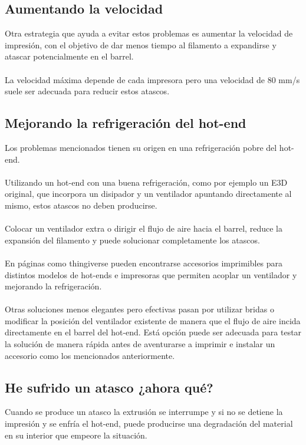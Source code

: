 \documentclass[11pt,a4paper]{article}
\begin{document}
	\subsection{Aumentando la velocidad}
Otra estrategia que ayuda a evitar estos problemas es aumentar la velocidad de impresión, con el objetivo de dar menos tiempo al filamento a expandirse y atascar potencialmente en el barrel.\\\\
La velocidad máxima depende de cada impresora pero una velocidad de 80 mm/s suele ser adecuada para reducir estos atascos.	\subsection{Mejorando la refrigeración del hot-end}
Los problemas mencionados tienen su origen en una refrigeración pobre del hot-end. \\\\
Utilizando un hot-end con una buena refrigeración, como por ejemplo un E3D original, que incorpora un disipador y un ventilador apuntando directamente al mismo, estos atascos no deben producirse.\\\\
Colocar un ventilador extra o dirigir el flujo de aire hacia el barrel, reduce la expansión del filamento y puede solucionar completamente los atascos.\\\\
En páginas como thingiverse pueden encontrarse accesorios imprimibles para distintos modelos de hot-ends e impresoras que permiten acoplar un ventilador y mejorando la refrigeración.\\\\
Otras soluciones menos elegantes pero efectivas pasan por utilizar bridas o modificar la posición del ventilador existente de manera que el flujo de aire incida directamente en el barrel del hot-end. Está opción puede ser adecuada para testar la solución de manera rápida antes de aventurarse a imprimir e instalar un accesorio como los mencionados anteriormente.	\subsection{He sufrido un atasco ¿ahora qué?}
Cuando se produce un atasco la extrusión se interrumpe y si no se detiene la impresión y se enfría el hot-end, puede producirse una degradación del material en su interior que empeore la situación.\\\\
\end{document}
